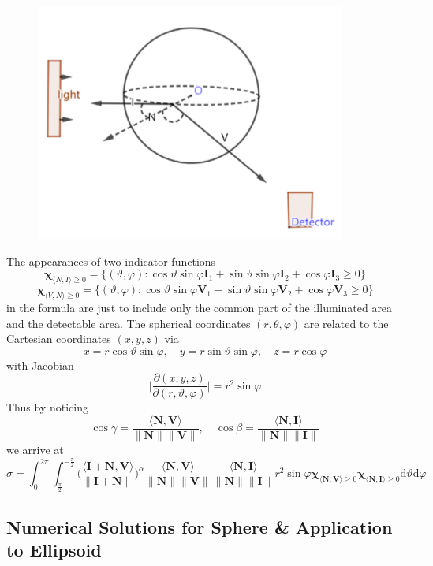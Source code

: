 \documentclass[11pt]{amsart}
\newcommand{\ip}[2]{\langle {#1}, {#2} \rangle}
\theoremstyle{definition}
\begin{document}
\begin{figure}[h!]
  \includegraphics[width=4in]{./figs/Sphere_edit.pdf}
  \label{fig:sphere}
\end{figure}
The appearances of two indicator functions 
$$\mathbf{\chi}_{\ip{N}{I}\geq 0}=\{(\vartheta,\varphi):\cos\vartheta\sin\varphi\mathbf{I}_1+\sin\vartheta\sin\varphi\mathbf{I}_2+\cos\varphi\mathbf{I}_3\geq 0\}$$ 
$$\mathbf{\chi}_{\ip{V}{N}\geq 0}=\{(\vartheta,\varphi): \cos\vartheta\sin\varphi\mathbf{V}_1+\sin\vartheta\sin\varphi\mathbf{V}_2+\cos\varphi\mathbf{V}_3\geq 0\}$$ 
in the formula are just to include only the common part of the illuminated area and the detectable area.
The spherical coordinates $(r,\theta,\varphi)$ are related to the Cartesian coordinates $(x,y,z)$ via
$$x =r\cos\vartheta \sin\varphi, \quad y=r\sin\vartheta \sin\varphi, \quad z=r\cos\varphi $$
with Jacobian 
$$\bigg|\frac{\partial(x,y,z)}{\partial(r,\vartheta,\varphi)}\bigg|= r^2 \sin\varphi $$
Thus by noticing 
$$\cos\gamma =\frac{\ip{\mathbf{N}}{\mathbf{V}}}{\|\mathbf{N}\| \|\mathbf{V}\|},\quad \cos\beta=\frac{\ip{\mathbf{N}}{\mathbf{I}}}{\|\mathbf{N}\| \|\mathbf{I}\|}$$
we arrive at
  $$\sigma =\int_{0}^{2\pi}\int_{\frac{\pi}{2}}^{-\frac{\pi}{2}}\Bigg(\frac{\ip{\mathbf{I}+\mathbf{N}}{\mathbf{V}}}{\|\mathbf{I}+\mathbf{N}\|}\Bigg)^\alpha\frac{\ip{\mathbf{N}}{\mathbf{V}}}{\|\mathbf{N}\| \|\mathbf{V}\|}\frac{\ip{\mathbf{N}}{\mathbf{I}}}{\|\mathbf{N}\| \|\mathbf{I}\|}r^2\sin\varphi\mathbf{\chi}_{\ip{\mathbf{N}}{\mathbf{V}}\geq 0}\mathbf{\chi}_{\ip{\mathbf{N}}{\mathbf{I}}\geq 0}\mathrm{d}\vartheta\mathrm{d}\varphi$$
  
\subsection{Numerical Solutions for Sphere \& Application to Ellipsoid}
\end{document}
